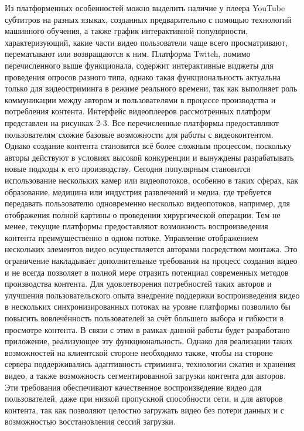 	Из платформенных особенностей можно выделить наличие у плеера YouTube субтитров на разных языках, созданных предварительно с помощью технологий машинного обучения, а также график интерактивной популярности, характеризующий, какие части видео пользователи чаще всего просматривают, перематывают или возвращаются к ним. Платформа Twitch, помимо перечисленного выше функционала, содержит интерактивные виджеты для проведения опросов разного типа, однако такая функциональность актуальна только для видеостриминга в режиме реального времени, так как выполняет роль коммуникации между автором и пользователями в процессе производства и потребления контента. Интерфейс видеоплееров рассмотренных платформ представлен на рисунках 2-3.
	Все перечисленные платформы предоставляют пользователям схожие базовые возможности для работы с видеоконтентом. Однако создание контента становится всё более сложным процессом, поскольку авторы действуют в условиях высокой конкуренции и вынуждены разрабатывать новые подходы к его производству. Сегодня популярным становится использование нескольких камер или видеопотоков, особенно в таких сферах, как образование, медицина или индустрия развлечений и медиа, где требуется передавать пользователю одновременно несколько видеопотоков, например, для отображения полной картины о проведении хирургической операции. Тем не менее, текущие платформы предоставляют возможность воспроизведения контента преимущественно в одном потоке. Управление отображением нескольких элементов видео осуществляется авторами посредством монтажа. Это ограничение накладывает дополнительные требования на процесс создания видео и не всегда позволяет в полной мере отразить потенциал современных методов производства контента.
	Для удовлетворения потребностей таких авторов и улучшения пользовательского опыта внедрение поддержки воспроизведения видео в нескольких синхронизированных потоках на уровне платформы позволило бы повысить вовлечённость пользователей за счёт большего выбора и гибкости в просмотре контента. В связи с этим в рамках данной работы будет разработано приложение, реализующее эту функциональность.
	Однако для реализации таких возможностей на клиентской стороне необходимо также, чтобы на стороне сервера поддерживались адаптивность стриминга, технологии сжатия и хранения видео, а также возможность сегментированной загрузки контента для авторов. Эти требования обеспечивают качественное воспроизведение видео для пользователей, даже при низкой пропускной способности сети, и для авторов контента, так как позволяют целостно загружать видео без потери данных и с возможностью восстановления сессий загрузки.

